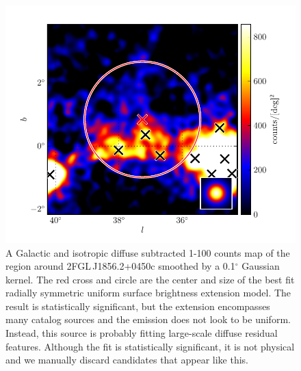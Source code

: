 \documentclass[12pt,preprint]{aastex}
\newcommand{\gev}{\text{GeV}\xspace}
\renewcommand{\deg}{\ensuremath{^\circ}\xspace}
\begin{document}
\clearpage
\begin{figure}
  \begin{center}
    \includegraphics{source_plots/example_bad_fit.pdf}
    \caption{
    A Galactic and isotropic diffuse subtracted 1-100 \gev counts map of
    the region around 2FGL\,J1856.2+0450c smoothed by a 0.1\deg Gaussian
    kernel. The red cross and circle are the center and size of the
    best fit radially symmetric uniform surface brightness extension
    model. The result is statistically
    significant, but the extension encompasses many catalog sources and
    the emission does not look to be uniform. Instead, this source is
    probably fitting large-scale diffuse residual features. Although the
    fit is statistically significant, it is not physical and we manually
    discard candidates that appear like this.
    }
    \label{example_bad_fit}
  \end{center}
\end{figure}
\end{document}
